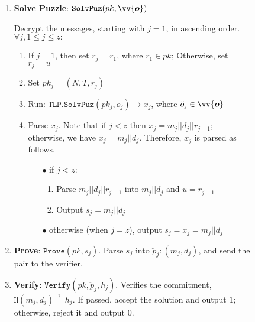 \begin{figure}
\begin{boxedminipage}{\columnwidth}
\begin{enumerate}
\item\textbf{Solve Puzzle}:  $\mathtt{SolvPuz}(pk, \vv{\bm{o}})$ 

 Decrypt the messages, starting with $j=1$, in ascending order.  $\forall j, 1\leq j\leq z:$
 
\begin{enumerate}
\item If $j=1$, then set $r_{\scriptscriptstyle j}=r_{\scriptscriptstyle 1}$, where $r_{\scriptscriptstyle 1}\in pk$; Otherwise, set $r_{\scriptscriptstyle j}=u$

\item Set  $pk_{\scriptscriptstyle j}=(N,T,r_{\scriptscriptstyle j})$

\item\label{call-RTLP-SolvPuz} Run: $\mathtt{TLP.SolvPuz}(pk_{\scriptscriptstyle j},\ddot{o}_{\scriptscriptstyle j})\rightarrow x_{\scriptscriptstyle j}$, where $\ddot{o}_{\scriptscriptstyle j}\in \vv{\bm{o}}$


\item\label{Dec-message} Parse $x_{\scriptscriptstyle j}$. Note that if $j<z$ then $x_{\scriptscriptstyle j}=m_{\scriptscriptstyle j}||d_{\scriptscriptstyle j}||r_{\scriptscriptstyle j+1}$; otherwise,  we have $x_{\scriptscriptstyle j}=m_{\scriptscriptstyle j}||d_{\scriptscriptstyle j}$. Therefore, $x_{\scriptscriptstyle j}$ is parsed as follows.

\begin{itemize}
\item[$\bullet$] if $j<z: $
\begin{enumerate}

\item Parse $m_{\scriptscriptstyle j}||d_{\scriptscriptstyle j}||r_{\scriptscriptstyle j+1}$ into  $m_{\scriptscriptstyle j}||d_{\scriptscriptstyle j}$ and $u=r_{\scriptscriptstyle j+1}$
\item Output $s_{\scriptscriptstyle j}=m_{\scriptscriptstyle j}||d_{\scriptscriptstyle j}$
\end{enumerate}
\item[$\bullet$] otherwise (when $j=z$),  output $s_{\scriptscriptstyle j}=x_{\scriptscriptstyle j}=m_{\scriptscriptstyle j}||d_{\scriptscriptstyle j}$


\end{itemize}

\end{enumerate}

\item\label{prove-} \textbf{Prove}:  $\mathtt{Prove}(pk, s_{\scriptscriptstyle j})$. Parse  $s_{\scriptscriptstyle j}$ into $\ddot{p}_{\scriptscriptstyle j}: (m_{\scriptscriptstyle j},d_{\scriptscriptstyle j})$, and send the pair to the verifier. 
\item\label{verify-} \textbf{Verify}: $\mathtt{Verify}(pk,\ddot{p}_{\scriptscriptstyle j}, h_{\scriptscriptstyle j})$. Verifies the commitment,  $\mathtt{H}(m_{\scriptscriptstyle j},d_{\scriptscriptstyle j})\stackrel{\scriptscriptstyle?}=h_{\scriptscriptstyle j}$. If passed, accept the solution and output $1$; otherwise,  reject it and output $0$.




\end{enumerate}
\end{boxedminipage}
\end{figure}
